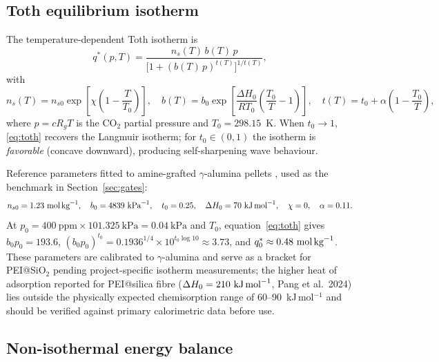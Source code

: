 \documentclass[a4paper]{amsart}
\theoremstyle{definition}
\begin{document}
\subsection{Toth equilibrium isotherm}

The temperature-dependent Toth isotherm \cite{Grossmann2023,Stampi2024} is
\begin{equation}
  q^*(p,T) = \frac{n_s(T)\,b(T)\,p}
               {\bigl[1+(b(T)\,p)^{t(T)}\bigr]^{1/t(T)}},
  \label{eq:toth}
\end{equation}
with
\begin{equation}
  n_s(T) = n_{s0}\exp\!\left[\chi\!\left(1-\frac{T}{T_0}\right)\right],\quad
  b(T)   = b_0\exp\!\left[\frac{\Delta H_0}{RT_0}\!\left(\frac{T_0}{T}-1\right)\right],\quad
  t(T)   = t_0 + \alpha\!\left(1-\frac{T_0}{T}\right),
  \label{eq:toth-T}
\end{equation}
where $p = c R_g T$ is the CO$_2$ partial pressure and $T_0 = 298.15$~K.
When $t_0\to1$, \eqref{eq:toth} recovers the Langmuir isotherm; for
$t_0\in(0,1)$ the isotherm is \emph{favorable} (concave downward), producing
self-sharpening wave behaviour.

Reference parameters fitted to amine-grafted $\gamma$-alumina pellets
\cite{Stampi2024,Grossmann2023}, used as the benchmark in Section~\ref{sec:gates}:
\begin{equation}
  n_{s0}=1.23~\text{mol\,kg}^{-1},\quad
  b_0=4839~\text{kPa}^{-1},\quad
  t_0=0.25,\quad
  \Delta H_0=70~\text{kJ\,mol}^{-1},\quad
  \chi=0,\quad
  \alpha=0.11.
  \label{eq:params}
\end{equation}
At $p_0 = 400~\text{ppm}\times101.325~\text{kPa} = 0.04~\text{kPa}$
and $T_0$, equation~\eqref{eq:toth} gives
$b_0 p_0 = 193.6$, $(b_0 p_0)^{t_0} = 0.1936^{1/4}\times10^{t_0\log10}\approx3.73$,
and $q_0^* \approx 0.48~\text{mol\,kg}^{-1}$.
These parameters are calibrated to $\gamma$-alumina and serve as a bracket
for PEI@SiO$_2$ pending project-specific isotherm measurements; the
higher heat of adsorption reported for PEI@silica fibre
($\Delta H_0=210~\text{kJ\,mol}^{-1}$, Pang et al.\ 2024) lies outside the
physically expected chemisorption range of 60--90~kJ\,mol$^{-1}$ and should be
verified against primary calorimetric data before use.

\subsection{Non-isothermal energy balance}
\end{document}
